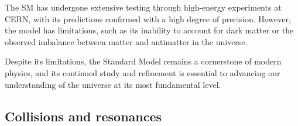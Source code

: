 The SM has undergone extensive testing through high-energy experiments at CERN, with its predictions confirmed with a high degree of precision. However, the model has limitations, such as its inability to account for dark matter or the observed imbalance between matter and antimatter in the universe.

Despite its limitations, the Standard Model remains a cornerstone of modern physics, and its continued study and refinement is essential to advancing our understanding of the universe at its most fundamental level.
\subsection{Collisions and resonances}
\label{sec:org874321a}
